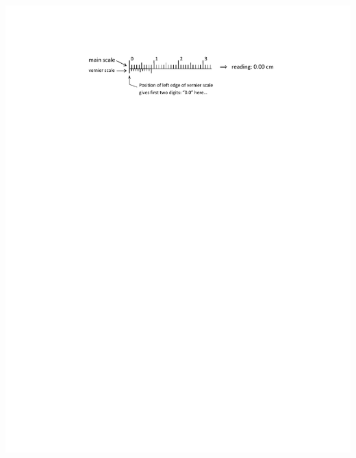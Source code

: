 \begin{center}
\medskip
\includegraphics{appendices/instrumentation/vernier_0p0_cm.pdf}


\end{center}
